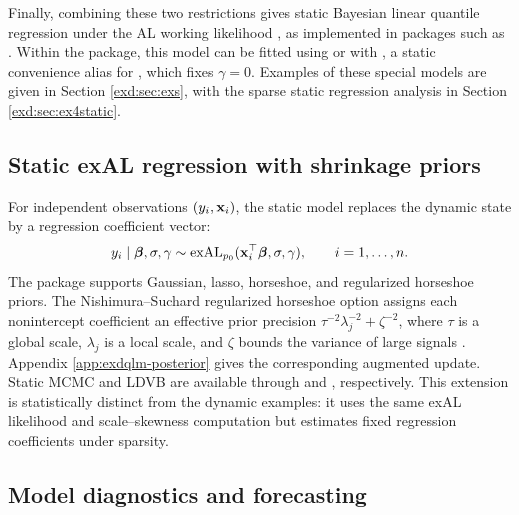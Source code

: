Finally, combining these two restrictions gives static Bayesian linear quantile regression under the AL working likelihood \cite{env-yu2001bayesian}, as implemented in packages such as . Within the  package, this model can be fitted using  or  with , a static convenience alias for , which fixes $\gamma=0$.
Examples of these special models are given in Section \ref{exd:sec:exs}, with the sparse static regression analysis in Section \ref{exd:sec:ex4static}.

\subsection{Static exAL regression with shrinkage priors}
\label{exd:sec:static-model}

For independent observations \((y_i,\mathbf{x}_i)\), the static model replaces the
dynamic state by a regression coefficient vector:
\begin{equation}
y_i\mid\boldsymbol{\beta},\sigma,\gamma
\sim\operatorname{exAL}_{p_0}(\mathbf{x}_i^\top\boldsymbol{\beta},\sigma,\gamma),
\qquad i=1,\ldots,n.
\label{exd:eq:static-exal}
\end{equation}
The package supports Gaussian, lasso, horseshoe, and regularized horseshoe
priors. The Nishimura--Suchard regularized horseshoe option assigns each
nonintercept coefficient an effective prior precision
\(\tau^{-2}\lambda_j^{-2}+\zeta^{-2}\), where \(\tau\) is a global scale,
\(\lambda_j\) is a local scale, and \(\zeta\) bounds the variance of large
signals \citep{exd-nishimura2023shrunken}. Appendix
\ref{app:exdqlm-posterior} gives the corresponding augmented update. Static
MCMC and LDVB are available through  and
, respectively. This extension is statistically
distinct from the dynamic examples: it uses the same exAL likelihood and
scale--skewness computation but estimates fixed regression coefficients under
sparsity.


\subsection{Model diagnostics and forecasting}
\label{exd:sec:diags}


